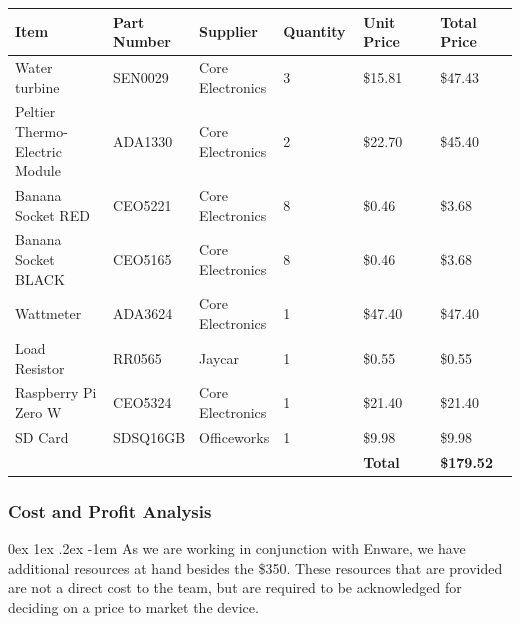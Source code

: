 \documentclass[12pt, a4paper]{article}
\makeatletter
\renewcommand\paragraph{\@startsection{paragraph}{5}{\parindent}%
  {0ex \@plus1ex \@minus.2ex}%
  {-1em}%
  {\normalfont\normalsize\bfseries}}
\makeatother
\begin{document}
            \endgroup
            \begingroup
                \centering
                \begin{flushleft}
                    \resizebox{\linewidth}{!} {
                        \begin{tabular}{| m{0.2\linewidth} | m{0.16\linewidth} | m{0.16\linewidth} | m{0.16\linewidth} | m{0.16\linewidth} | m{0.16\linewidth} |}
                            \hline
                            \textbf {Item} & \textbf {Part Number} & \textbf {Supplier} & \textbf {Quantity} & \textbf {Unit Price} & \textbf {Total Price} \\ \hline
                            Water turbine & SEN0029 & Core Electronics & 3 & \$15.81 & \$47.43 \\ \hline
                            Peltier Thermo-Electric Module & ADA1330 & Core Electronics & 2 & \$22.70 & \$45.40 \\ \hline
                            Banana Socket RED & CEO5221 & Core Electronics & 8 & \$0.46 & \$3.68 \\ \hline
                            Banana Socket BLACK & CEO5165 & Core Electronics & 8 & \$0.46 & \$3.68 \\ \hline
                            Wattmeter & ADA3624 & Core Electronics & 1 & \$47.40 & \$47.40 \\ \hline
                            Load Resistor & RR0565 & Jaycar & 1 & \$0.55 & \$0.55 \\ \hline
                            Raspberry Pi Zero W & CEO5324 & Core Electronics & 1 & \$21.40 & \$21.40 \\ \hline
                            SD Card & SDSQ16GB & Officeworks & 1 & \$9.98 & \$9.98 \\ \hline
                            & & & & \textbf {Total} & \textbf {\$179.52} \\
                            \hline
                        \end{tabular}
                    }
                    \label{tbl:budgettable}
                \end{flushleft}
            \endgroup
            \subsubsection{Cost and Profit Analysis}
                \paragraph{}
                    As we are working in conjunction with Enware, we have additional resources at hand besides the \$350. These resources that are provided are not a 
                    direct cost to the team, but are required to be acknowledged for deciding on a price to market the device.
\end{document}
